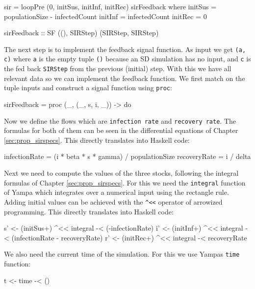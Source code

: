 \begin{HaskellCode}
sir = loopPre (0, initSus, initInf, initRec) sirFeedback
  where
    initSus = populationSize - infectedCount
    initInf = infectedCount
    initRec = 0
  
sirFeedback :: SF ((), SIRStep) (SIRStep, SIRStep)
\end{HaskellCode}

The next step is to implement the feedback signal function. As input we get \texttt{(a, c)} where \texttt{a} is the empty tuple \texttt{()} because an SD simulation has no input, and \texttt{c} is the fed back \texttt{SIRStep} from the previous (initial) step. With this we have all relevant data so we can implement the feedback function. We first match on the tuple inputs and construct a signal function using \texttt{proc}:

\begin{HaskellCode}
sirFeedback = proc (_, (_, s, i, _)) -> do
\end{HaskellCode}

Now we define the flows which are \texttt{infection rate} and \texttt{recovery rate}. The formulas for both of them can be seen in the differential equations of Chapter \ref{sec:prop_sirspecs}. This directly translates into Haskell code:

\begin{HaskellCode}
infectionRate = (i * beta * s * gamma) / populationSize
recoveryRate  = i / delta
\end{HaskellCode}

Next we need to compute the values of the three stocks, following the integral formulas of Chapter \ref{sec:prop_sirspecs}. For this we need the \texttt{integral} function of Yampa which integrates over a numerical input using the rectangle rule. Adding initial values can be achieved with the \texttt{\string^<<} operator of arrowized programming. This directly translates into Haskell code:

\begin{HaskellCode}
s' <- (initSus+) ^<< integral -< (-infectionRate)
i' <- (initInf+) ^<< integral -< (infectionRate - recoveryRate)
r' <- (initRec+) ^<< integral -< recoveryRate
\end{HaskellCode}

We also need the current time of the simulation. For this we use Yampas \texttt{time} function:

\begin{HaskellCode}
t <- time -< ()
\end{HaskellCode}


